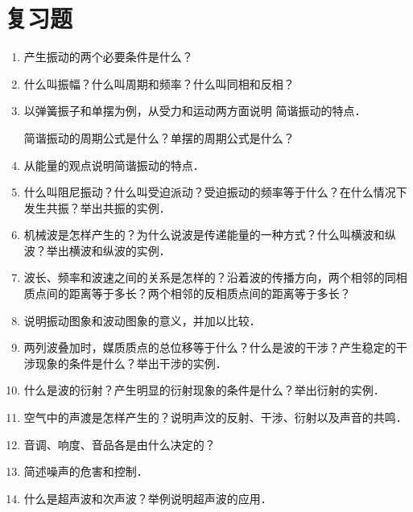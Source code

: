 \section*{复习题}
\begin{enumerate}
    \item 产生振动的两个必要条件是什么？
    \item 什么叫振幅？什么叫周期和频率？什么叫同相和反相？
    \item 以弹簧振子和单摆为例，从受力和运动两方面说明
          简谐振动的特点．

          简谐振动的周期公式是什么？单摆的周期公式是什么？

    \item 从能量的观点说明简谐振动的特点．
    \item 什么叫阻尼振动？什么叫受迫派动？受迫振动的频率等于什么？在什么情况下发生共振？举出共振的实例．
    \item 机械波是怎样产生的？为什么说波是传递能量的一种方式？什么叫横波和纵波？举出横波和纵波的实例．
    \item 波长、频率和波速之间的关系是怎样的？沿着波的传播方向，两个相邻的同相质点间的距离等于多长？两个相邻的反相质点间的距离等于多长？
    \item 说明振动图象和波动图象的意义，并加以比较．
    \item 两列波叠加时，媒质质点的总位移等于什么？什么是波的干涉？产生稳定的干涉现象的条件是什么？举出干涉的实例．
    \item 什么是波的衍射？产生明显的衍射现象的条件是什么？举出衍射的实例．
    \item 空气中的声渡是怎样产生的？说明声汶的反射、干涉、衍射以及声音的共鸣．
    \item 音调、响度、音品各是由什么决定的？
    \item 简述噪声的危害和控制．
    \item 什么是超声波和次声波？举例说明超声波的应用．
\end{enumerate}

